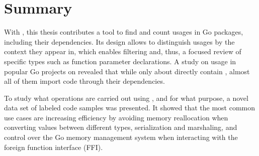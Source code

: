 \section{Summary}\label{sec:go-geiger:summary}

With \toolGeiger{}, this thesis contributes a tool to find and count \unsafe{} usages in Go packages, including their
dependencies.
Its design allows to distinguish usages by the context they appear in, which enables filtering and, thus, a focused
review of specific types such as function parameter declarations.
A study on \unsafe{} usage in \projsAnalyzed{} popular Go projects on \github{} revealed that while only about
 directly contain \unsafe{}, almost all of them import \unsafe{} code through their dependencies.

To study what operations are carried out using \unsafe{}, and for what purpose, a novel data set of
\numberLabeledCodeSnippets{} labeled code samples was presented.
It showed that the most common use cases are increasing efficiency by avoiding memory reallocation when converting
values between different types, serialization and marshaling, and control over the Go memory management system when
interacting with the foreign function interface (\acrshort{FFI}).
